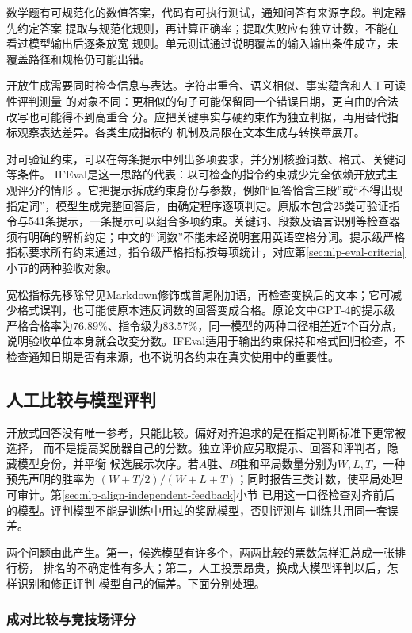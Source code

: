 数学题有可规范化的数值答案，代码有可执行测试，通知问答有来源字段。判定器先约定答案
提取与规范化规则，再计算正确率；提取失败应有独立计数，不能在看过模型输出后逐条放宽
规则。单元测试通过说明覆盖的输入输出条件成立，未覆盖路径和规格仍可能出错。

开放生成需要同时检查信息与表达。字符串重合、语义相似、事实蕴含和人工可读性评判测量
的对象不同：更相似的句子可能保留同一个错误日期，更自由的合法改写也可能得不到高重合
分。应把关键事实与硬约束作为独立判据，再用替代指标观察表达差异。各类生成指标的
机制及局限在文本生成与转换章展开。

对可验证约束，可以在每条提示中列出多项要求，并分别核验词数、格式、关键词等条件。
IFEval是这一思路的代表：以可检查的指令约束减少完全依赖开放式主观评分的情形
。它把提示拆成约束身份与参数，例如“回答恰含三段”或“不得出现指定词”，模型生成完整回答后，由确定程序逐项判定。原版本包含25类可验证指令与541条提示，一条提示可以组合多项约束。关键词、段数及语言识别等检查器须有明确的解析约定；中文的“词数”不能未经说明套用英语空格分词。提示级严格指标要求所有约束通过，指令级严格指标按每项统计，对应第\ref{sec:nlp-eval-criteria}小节的两种验收对象。

宽松指标先移除常见Markdown修饰或首尾附加语，再检查变换后的文本；它可减少格式误判，也可能使原本违反词数的回答变成合格。原论文中GPT-4的提示级严格合格率为$76.89\%$、指令级为$83.57\%$，同一模型的两种口径相差近7个百分点，说明验收单位本身就会改变分数。IFEval适用于输出约束保持和格式回归检查，不检查通知日期是否有来源，也不说明各约束在真实使用中的重要性。

\subsection{人工比较与模型评判}
\label{sec:nlp-eval-judges}

开放式回答没有唯一参考，只能比较。偏好对齐追求的是在指定判断标准下更常被选择，
而不是提高奖励器自己的分数。独立评价应另取提示、回答和评判者，隐藏模型身份，并平衡
候选展示次序。若$A$胜、$B$胜和平局数量分别为$W,L,T$，一种预先声明的胜率为
$(W+T/2)/(W+L+T)$；同时报告三类计数，使平局处理可审计。第\ref{sec:nlp-align-independent-feedback}小节
已用这一口径检查对齐前后的模型。评判模型不能是训练中用过的奖励模型，否则评测与
训练共用同一套误差。

两个问题由此产生。第一，候选模型有许多个，两两比较的票数怎样汇总成一张排行榜，
排名的不确定性有多大；第二，人工投票昂贵，换成大模型评判以后，怎样识别和修正评判
模型自己的偏差。下面分别处理。

\subsubsection{成对比较与竞技场评分}
\label{sec:nlp-eval-arena}

